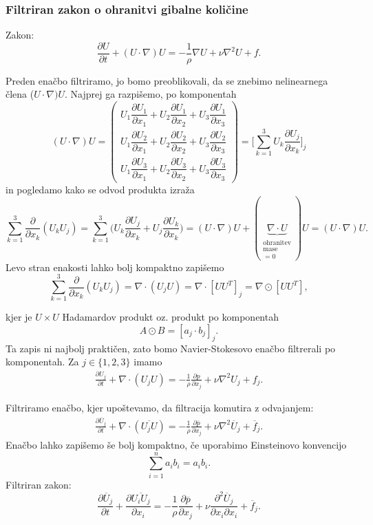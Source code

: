 \documentclass[mat2, tisk]{fmfdelo}
\begin{document}
\subsubsection{Filtriran zakon o ohranitvi gibalne količine}

Zakon: 
$$
\frac{\partial U}{\partial t} + (U\cdot \nabla)U = -\frac{1}{\rho} \nabla U + \nu\nabla^2 U + f.
$$

\noindent
Preden enačbo filtriramo, jo bomo preoblikovali, da se znebimo nelinearnega člena ($U\cdot \nabla)U$.
Najprej ga razpišemo, po komponentah 
\renewcommand{\arraystretch}{2.5} %
\[
(U \cdot \nabla) U =
\begin{pmatrix}
U_1 \dfrac{\partial U_1}{\partial x_1} + U_2 \dfrac{\partial U_1}{\partial x_2} + U_3 \dfrac{\partial U_1}{\partial x_3} \\
U_1 \dfrac{\partial U_2}{\partial x_1} + U_2 \dfrac{\partial U_2}{\partial x_2} + U_3 \dfrac{\partial U_2}{\partial x_3} \\
U_1 \dfrac{\partial U_3}{\partial x_1} + U_2 \dfrac{\partial U_3}{\partial x_2} + U_3 \dfrac{\partial U_3}{\partial x_3}
\end{pmatrix} = \Big[\sum_{k=1}^3 U_k \frac{\partial U_j}{\partial x_k}\Big]_j
\]
in pogledamo kako se odvod produkta izraža 
$$
\sum_{k=1}^3 \frac{\partial}{\partial x_k} (U_k U_j) = \sum_{k=1}^3 \Big(U_k\frac{\partial U_j}{\partial x_k}
+ U_j\frac{\partial U_k}{\partial x_k}\Big) = (U\cdot \nabla)U + (\underbrace{\nabla\cdot U}_{\substack{\text{ohranitev}\\{\text{mase}}\\=0}}) U
= (U\cdot \nabla)U.
$$
Levo stran enakosti lahko bolj kompaktno zapišemo
$$
\sum_{k=1}^3 \frac{\partial}{\partial x_k} (U_k U_j) = \nabla \cdot (U_j U) = 
\nabla \cdot [U U^T]_{j} = \nabla \odot [U U^T],
$$
\newpage

kjer je $U\times U$ Hadamardov produkt oz. produkt po komponentah 
\[
A \odot B = \left[ a_j \cdot b_j \right]_j.
\]
Ta zapis ni najbolj praktičen, zato bomo Navier-Stokesovo enačbo filtrerali po komponentah.
Za $j\in \{1, 2, 3\}$ imamo 
\begin{align*}
\frac{\partial U_j}{\partial t} + \nabla\cdot(U_j U) = -\frac{1}{\rho} \frac{\partial p}{\partial x_j} + \nu\nabla^2 U_j + f_j.
\end{align*}

Filtriramo enačbo, kjer upoštevamo, da filtracija komutira z odvajanjem:
\begin{align*}
  \frac{\partial \overline{U}_j}{\partial t} + \nabla\cdot(\overline{U_j U}) = -\frac{1}{\rho} \frac{\partial \overline{p}}{\partial x_j} + \nu\nabla^2 \overline{U}_j + \overline{f}_j.
\end{align*}
Enačbo lahko zapišemo še bolj kompaktno, če uporabimo Einsteinovo konvencijo 
$$
\sum_{i=1}^n a_i b_i = a_i b_i.
$$
Filtriran zakon:
\begin{equation}
\frac{\partial \overline{U}_j}{\partial t} + \frac{\partial \overline{U_i U_j}}{\partial x_i} = -\frac{1}{\rho} \frac{\partial \overline{p}}{\partial x_j} + \nu \frac{\partial^2 \overline{U}_j}{\partial x_i \partial x_i} + \overline{f}_j.
\end{equation}
\end{document}

